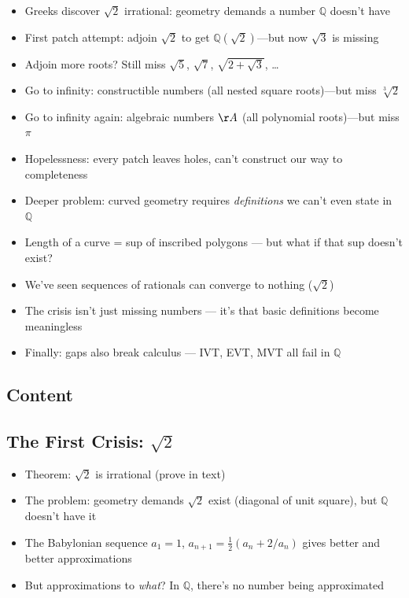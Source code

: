 \documentclass[
  10pt,
  letterpaper,
]{scrbook}
\providecommand{\tightlist}{%
  \setlength{\itemsep}{0pt}\setlength{\parskip}{0pt}}
\newcommand{\QQ}{\mathbb{Q}}
\begin{document}
\begin{itemize}
\tightlist
\item
  Greeks discover \(\sqrt{2}\) irrational: geometry demands a number
  \(\QQ\) doesn't have
\item
  First patch attempt: adjoin \(\sqrt{2}\) to get
  \(\QQ(\sqrt{2})\)---but now \(\sqrt{3}\) is missing
\item
  Adjoin more roots? Still miss \(\sqrt{5}\), \(\sqrt{7}\),
  \(\sqrt{2 + \sqrt{3}}\), \ldots{}
\item
  Go to infinity: constructible numbers (all nested square roots)---but
  miss \(\sqrt[3]{2}\)
\item
  Go to infinity again: algebraic numbers \(\AA\) (all polynomial
  roots)---but miss \(\pi\)
\item
  Hopelessness: every patch leaves holes, can't construct our way to
  completeness
\item
  Deeper problem: curved geometry requires \emph{definitions} we can't
  even state in \(\QQ\)
\item
  Length of a curve = sup of inscribed polygons --- but what if that sup
  doesn't exist?
\item
  We've seen sequences of rationals can converge to nothing
  (\(\sqrt{2}\))
\item
  The crisis isn't just missing numbers --- it's that basic definitions
  become meaningless
\item
  Finally: gaps also break calculus --- IVT, EVT, MVT all fail in
  \(\QQ\)
\end{itemize}

\subsection{Content}\label{content-1}

\subsection{\texorpdfstring{The First Crisis:
\(\sqrt{2}\)}{The First Crisis: \textbackslash sqrt\{2\}}}\label{the-first-crisis-sqrt2}

\begin{itemize}
\tightlist
\item
  Theorem: \(\sqrt{2}\) is irrational (prove in text)
\item
  The problem: geometry demands \(\sqrt{2}\) exist (diagonal of unit
  square), but \(\QQ\) doesn't have it
\item
  The Babylonian sequence \(a_1 = 1\),
  \(a_{n+1} = \frac{1}{2}(a_n + 2/a_n)\) gives better and better
  approximations
\item
  But approximations to \emph{what}? In \(\QQ\), there's no number being
  approximated
\end{itemize}
\end{document}
